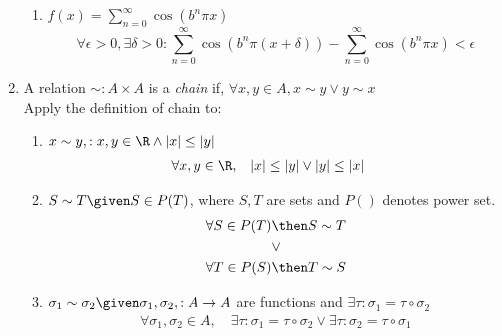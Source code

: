 \documentclass[basic, header]{nosvagor-notes}
\begin{document}
\begin{enumerate}[itemsep=5em]
\begin{enumerate}[itemsep=3em]
      \item \(\displaystyle f(x) = \sum_{n=0}^{\infty} \cos(b^n \pi x)\)
        \[%
          \forall \epsilon > 0, \exists \delta > 0 :
          \sum_{n=0}^{\infty} \cos (b^n \pi (x+\delta)) -
          \sum_{n=0}^{\infty} \cos (b^n \pi x) < \epsilon
        \]%

    \end{enumerate}

  \newpage %

  \item A relation \(\sim : A \times A \) is a \textit{chain} if, \(\forall x,y \in A,
    x\sim y \lor y \sim x\) \\
    Apply the definition of chain to:

    \begin{enumerate}[itemsep=2em]

      \item \(x \sim y, : x,y \in \R \land |x| \leq |y|\)
        \begin{align*}
          \forall x,y \in \R, &\quad |x| \leq |y|
          \lor
          |y| \leq |x|
        \end{align*}

      \item \(S\sim T \given S \in P(T)\), where \(S,T\) are sets and \(P()\)
        denotes power set.
        \begin{align*}
          \forall S \in P(T) &\then S \sim T \\
            &\lor \\
          \forall T \in P(S) &\then T \sim S
        \end{align*}

      \item \(\sigma_1 \sim \sigma_2 \given \sigma_1, \sigma_2, : A\to A\) are
        functions and \(\exists \tau : \sigma_1 = \tau \circ \sigma_2 \)
        \begin{align*}
          \forall \sigma_1, \sigma_2 \in A, \quad \exists \tau :
          \sigma_1 = \tau \circ \sigma_2
          \lor
          \exists \tau : \sigma_2 = \tau \circ \sigma_1
        \end{align*}

    \end{enumerate}


\end{enumerate}
\end{document}
